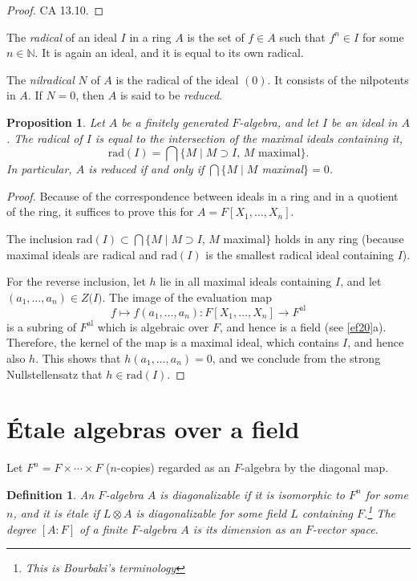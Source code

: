 \documentclass[a4paper,11pt,final,openany]{memoir}
\newtheorem{proposition}[X]{Proposition}
\newtheorem{definition}[X]{Definition}
\theoremstyle{nonumberplain}
\newtheorem{proof}{Proof.}
\begin{document}
\begin{proof}
CA 13.10.
\end{proof}

The \emph{radical} of an ideal $I$ in a ring $A$ is the set of $f\in A$ such
that $f^{n}\in I$ for some $n\in\mathbb{N}{}$. It is again an ideal, and it is
equal to its own radical.

The \emph{nilradical} $N$ of $A$ is the radical of the ideal $(0)$. It
consists of the nilpotents in $A$. If $N=0$, then $A$ is said to be
\emph{reduced}.

\begin{proposition}
\label{ca2}Let $A$ be a finitely generated $F$-algebra, and let $I$ be an
ideal in $A$. The radical of $I$ is equal to the intersection of the maximal
ideals containing it,
\[
\mathrm{rad}(I)=\bigcap\{M\mid M\supset I\text{, }M\text{ maximal}\}.
\]
In particular, $A$ is reduced if and only if $\bigcap\{M\mid M$ maximal$\}=0$.
\end{proposition}

\begin{proof}
Because of the correspondence between ideals in a ring and in a quotient of
the ring, it suffices to prove this for $A=F[X_{1},\ldots,X_{n}]$.

The inclusion $\mathrm{rad}(I)\subset\bigcap\{M\mid M\supset I$, $M$
maximal$\}$ holds in any ring (because maximal ideals are radical and
$\mathrm{rad}(I)$ is the smallest radical ideal containing $I$).

For the reverse inclusion, let $h$ lie in all maximal ideals containing $I$,
and let $(a_{1},\ldots,a_{n})\in Z(I\mathfrak{)}{}$. The image of the
evaluation map
\[
f\mapsto f(a_{1},\ldots,a_{n})\colon F[X_{1},\ldots,X_{n}]\rightarrow
F^{\mathrm{al}}%
\]
is a subring of $F^{\mathrm{al}}$ which is algebraic over $F$, and hence is a
field (see \ref{ef20}a). Therefore, the kernel of the map is a maximal ideal,
which contains $I$, and hence also $h$. This shows that $h(a_{1},\ldots
,a_{n})=0$, and we conclude from the strong Nullstellensatz that
$h\in\mathrm{\mathrm{rad}}(I)$.
\end{proof}

\section{\'{E}tale algebras over a field}

Let $F^{n}=F\times\cdots\times F$ ($n$-copies) regarded as an $F$-algebra by
the diagonal map.

\begin{definition}
\label{B65}An $F$-algebra $A$ is%
\emph{diagonalizable} if it is isomorphic to $F^{n}$ for some $n$, and it is%
\emph{\'{e}tale} if $L\otimes A$ is diagonalizable for some field $L$
containing $F$.\footnote{This is Bourbaki's terminology} The \emph{degree}%
$[A\colon F]$ of a finite $F$-algebra $A$ is its dimension as an $F$-vector space.
\end{definition}
\end{document}
